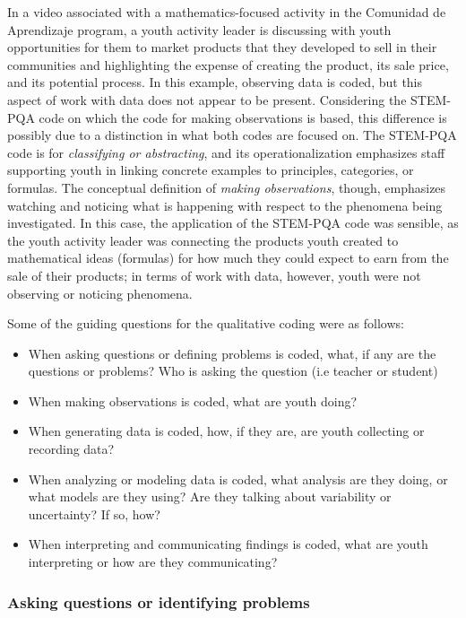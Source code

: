 \documentclass[]{msu-thesis}
\providecommand{\tightlist}{%
  \setlength{\itemsep}{0pt}\setlength{\parskip}{0pt}}
\theoremstyle{definition}
\theoremstyle{definition}
\theoremstyle{definition}
\theoremstyle{remark}
\begin{document}
In a video associated with a mathematics-focused activity in the
Comunidad de Aprendizaje program, a youth activity leader is discussing
with youth opportunities for them to market products that they developed
to sell in their communities and highlighting the expense of creating
the product, its sale price, and its potential process. In this example,
observing data is coded, but this aspect of work with data does not
appear to be present. Considering the STEM-PQA code on which the code
for making observations is based, this difference is possibly due to a
distinction in what both codes are focused on. The STEM-PQA code is for
\emph{classifying or abstracting}, and its operationalization emphasizes
staff supporting youth in linking concrete examples to principles,
categories, or formulas. The conceptual definition of \emph{making
observations}, though, emphasizes watching and noticing what is
happening with respect to the phenomena being investigated. In this
case, the application of the STEM-PQA code was sensible, as the youth
activity leader was connecting the products youth created to
mathematical ideas (formulas) for how much they could expect to earn
from the sale of their products; in terms of work with data, however,
youth were not observing or noticing phenomena.

Some of the guiding questions for the qualitative coding were as
follows:

\begin{itemize}
\tightlist
\item
  When asking questions or defining problems is coded, what, if any are
  the questions or problems? Who is asking the question (i.e teacher or
  student)
\item
  When making observations is coded, what are youth doing?
\item
  When generating data is coded, how, if they are, are youth collecting
  or recording data?
\item
  When analyzing or modeling data is coded, what analysis are they
  doing, or what models are they using? Are they talking about
  variability or uncertainty? If so, how?
\item
  When interpreting and communicating findings is coded, what are youth
  interpreting or how are they communicating?
\end{itemize}

\subsubsection{Asking questions or identifying
problems}\label{asking-questions-or-identifying-problems}
\end{document}
